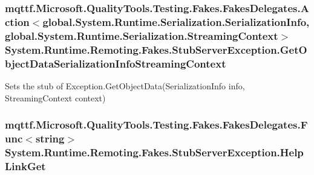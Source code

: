\hypertarget{class_system_1_1_runtime_1_1_remoting_1_1_fakes_1_1_stub_server_exception_a72f1efb47603cd225b676480220fa683}{
\subsubsection[{Get\-Object\-Data\-Serialization\-Info\-Streaming\-Context}]{\setlength{\rightskip}{0pt plus 5cm}mqttf.\-Microsoft.\-Quality\-Tools.\-Testing.\-Fakes.\-Fakes\-Delegates.\-Action$<$global.\-System.\-Runtime.\-Serialization.\-Serialization\-Info, global.\-System.\-Runtime.\-Serialization.\-Streaming\-Context$>$ System.\-Runtime.\-Remoting.\-Fakes.\-Stub\-Server\-Exception.\-Get\-Object\-Data\-Serialization\-Info\-Streaming\-Context}}\label{class_system_1_1_runtime_1_1_remoting_1_1_fakes_1_1_stub_server_exception_a72f1efb47603cd225b676480220fa683}


Sets the stub of Exception.\-Get\-Object\-Data(\-Serialization\-Info info, Streaming\-Context context)

\hypertarget{class_system_1_1_runtime_1_1_remoting_1_1_fakes_1_1_stub_server_exception_ace29b3097e208c49dbbb7135e5769319}{
\subsubsection[{Help\-Link\-Get}]{\setlength{\rightskip}{0pt plus 5cm}mqttf.\-Microsoft.\-Quality\-Tools.\-Testing.\-Fakes.\-Fakes\-Delegates.\-Func$<$string$>$ System.\-Runtime.\-Remoting.\-Fakes.\-Stub\-Server\-Exception.\-Help\-Link\-Get}}\label{class_system_1_1_runtime_1_1_remoting_1_1_fakes_1_1_stub_server_exception_ace29b3097e208c49dbbb7135e5769319}


